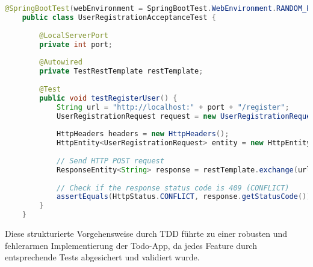 \begin{lstlisting}[language=Java]
	@SpringBootTest(webEnvironment = SpringBootTest.WebEnvironment.RANDOM_PORT)
	public class UserRegistrationAcceptanceTest {
		
		@LocalServerPort
		private int port;
		
		@Autowired
		private TestRestTemplate restTemplate;
		
		@Test
		public void testRegisterUser() {
			String url = "http://localhost:" + port + "/register";
			UserRegistrationRequest request = new UserRegistrationRequest("testuser", "password", "password");
			
			HttpHeaders headers = new HttpHeaders();
			HttpEntity<UserRegistrationRequest> entity = new HttpEntity<>(request, headers);
			
			// Send HTTP POST request
			ResponseEntity<String> response = restTemplate.exchange(url, HttpMethod.POST, entity, String.class);
			
			// Check if the response status code is 409 (CONFLICT)
			assertEquals(HttpStatus.CONFLICT, response.getStatusCode());
		}
	}
\end{lstlisting}

Diese strukturierte Vorgehensweise durch TDD führte zu einer robusten und fehlerarmen Implementierung der Todo-App, da jedes Feature durch entsprechende Tests abgesichert und validiert wurde.

